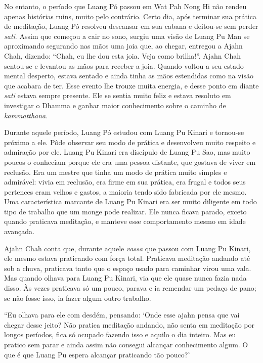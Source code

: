 No entanto, o período que Luang Pó passou em Wat Pah Nong Hi não rendeu
apenas histórias ruins, muito pelo contrário. Certo dia, após terminar
sua prática de meditação, Luang Pó resolveu descansar em sua cabana e
deitou-se sem perder \emph{sati}. Assim que começou a cair no sono,
surgiu uma visão de Luang Pu Man se aproximando segurando nas mãos uma
joia que, ao chegar, entregou a Ajahn Chah, dizendo: ``Chah, eu lhe dou
esta joia. Veja como brilha!''. Ajahn Chah sentou-se e levantou as mãos
para receber a joia. Quando voltou a seu estado mental desperto, estava
sentado e ainda tinha as mãos estendidas como na visão que acabara de
ter. Esse evento lhe trouxe muita energia, e desse ponto em diante
\emph{sati} estava sempre presente. Ele se sentia muito feliz e estava
resoluto em investigar o Dhamma e ganhar maior conhecimento sobre o
caminho de \emph{kammatthāna}.

Durante aquele período, Luang Pó estudou com Luang Pu Kinari e tornou-se
próximo a ele. Pôde observar seu modo de prática e desenvolveu muito
respeito e admiração por ele. Luang Pu Kinari era discípulo de Luang Pu
Sao, mas muito poucos o conheciam porque ele era uma pessoa distante,
que gostava de viver em reclusão. Era um mestre que tinha um modo de
prática muito simples e admirável: vivia em reclusão, era firme em sua
prática, era frugal e todos seus pertences eram velhos e gastos, a
maioria tendo sido fabricada por ele mesmo. Uma característica marcante
de Luang Pu Kinari era ser muito diligente em todo tipo de trabalho que
um monge pode realizar. Ele nunca ficava parado, exceto quando praticava
meditação, e manteve esse comportamento mesmo em idade avançada.

Ajahn Chah conta que, durante aquele \emph{vassa} que passou com Luang
Pu Kinari, ele mesmo estava praticando com força total. Praticava
meditação andando até sob a chuva, praticava tanto que o espaço usado
para caminhar virou uma vala. Mas quando olhava para Luang Pu Kinari,
via que ele quase nunca fazia nada disso. Às vezes praticava só um
pouco, parava e ia remendar um pedaço de pano; se não fosse isso, ia
fazer algum outro trabalho.

``Eu olhava para ele com desdém, pensando: `Onde esse ajahn pensa que
vai chegar desse jeito? Não pratica meditação andando, não senta em
meditação por longos períodos, fica só ocupado fazendo isso e aquilo o
dia inteiro. Mas eu pratico sem parar e ainda assim não consegui
alcançar conhecimento algum. O que é que Luang Pu espera alcançar
praticando tão pouco?'

